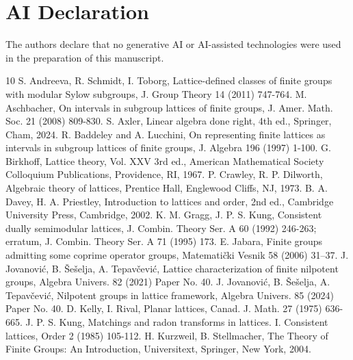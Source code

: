 \documentclass[12pt]{article}
\begin{document}
\section*{AI Declaration}
The authors declare that no generative AI or AI-assisted technologies were used in the preparation of this manuscript.
\begin{thebibliography}{10}
 S. Andreeva, R. Schmidt, I. Toborg, Lattice-defined classes of finite groups with modular Sylow subgroups, J. Group Theory 14 (2011) 747-764.
 M. Aschbacher, On intervals in subgroup lattices of finite groups, J. Amer. Math. Soc. 21 (2008) 809-830.
 S. Axler, Linear algebra done right, 4th ed., Springer, Cham, 2024.
 R. Baddeley and A. Lucchini, On representing finite lattices as intervals in subgroup lattices of finite groups, J. Algebra 196 (1997) 1-100.
 G. Birkhoff, Lattice theory, Vol. XXV 3rd ed., American Mathematical Society Colloquium Publications, Providence, RI, 1967.
 P. Crawley, R. P. Dilworth, Algebraic theory of lattices, Prentice Hall, Englewood Cliffs, NJ, 1973.
  B. A. Davey, H. A. Priestley, Introduction to lattices and order, 2nd ed., Cambridge University Press, Cambridge, 2002.
 K. M. Gragg, J. P. S. Kung, Consistent dually semimodular lattices, J. Combin. Theory Ser. A 60 (1992) 246-263; erratum, J. Combin. Theory Ser. A 71 (1995) 173.
 E. Jabara, Finite groups admitting some coprime operator groups, Matemati\v{c}ki Vesnik 58 (2006) 31–37.
 J. Jovanovi\'{c}, B. \v{S}e\v{s}elja, A. Tepav\v{c}evi\'{c}, Lattice characterization of finite nilpotent groups, Algebra Univers. 82 (2021) Paper No. 40.
 J. Jovanovi\'{c}, B. \v{S}e\v{s}elja, A. Tepav\v{c}evi\'{c}, Nilpotent groups in lattice framework, Algebra Univers. 85 (2024) Paper No. 40.
 D. Kelly, I. Rival, Planar lattices, Canad. J. Math. 27 (1975) 636-665. 
 J. P. S. Kung, Matchings and radon transforms in lattices. I. Consistent lattices, Order 2 (1985) 105-112.
 H. Kurzweil, B. Stellmacher, The Theory of Finite Groups: An Introduction, Universitext, Springer, New York, 2004.

\end{thebibliography}
\end{document}
